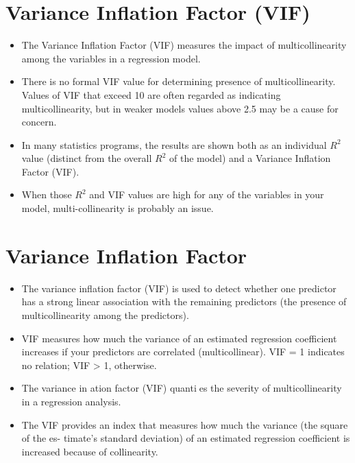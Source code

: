 \documentclass[]{report}
\begin{document}
\section*{Variance Inflation Factor (VIF)}
\begin{itemize}
\item The Variance Inflation Factor (VIF) measures the impact of multicollinearity among the variables in a regression model.
\item There is no formal VIF value for determining presence of multicollinearity. Values of VIF
that exceed 10 are often regarded as indicating multicollinearity, but in weaker models values
above 2.5 may be a cause for concern. 
\item In many statistics programs, the results are shown both
as an individual $R^2$ value (distinct from the overall $R^2$ of the model) and a Variance Inflation
Factor (VIF). 
\item When those $R^2$ and VIF values are high for any of the variables in your model,
multi-collinearity is probably an issue.

\end{itemize}




\section*{Variance Inflation Factor}
\begin{itemize}
\item The variance inflation factor (VIF) is used to detect whether one predictor has a strong linear
association with the remaining predictors (the presence of multicollinearity among the
predictors). 
\item VIF measures how much the variance of an estimated regression coefficient
increases if your predictors are correlated (multicollinear).
VIF = 1 indicates no relation; VIF > 1, otherwise.
\item The variance in
ation factor (VIF) quanties the severity of multicollinearity in a regression
analysis.
\item The VIF provides an index that measures how much the variance (the square of the es-
timate's standard deviation) of an estimated regression coefficient is increased because of
collinearity.

\end{itemize}
\end{document}
